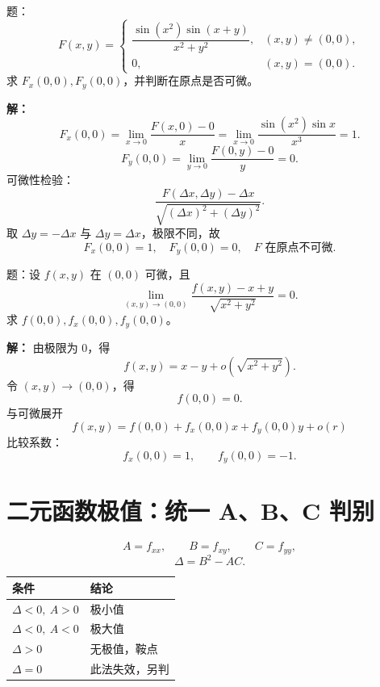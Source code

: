 \documentclass[11pt,a4paper,UTF8]{ctexart}
\begin{document}
\newpage

\begin{answerbox}[2020--2021 大题：分段函数偏导与可微性]
题：
\[
F(x,y)=
\begin{cases}
\dfrac{\sin(x^2)\sin(x+y)}{x^2+y^2},&(x,y)\ne(0,0),\\
0,&(x,y)=(0,0).
\end{cases}
\]
求 \(F_x(0,0),F_y(0,0)\)，并判断在原点是否可微。

\textbf{解：}
\[
F_x(0,0)=\lim_{x\to0}\frac{F(x,0)-0}{x}
=\lim_{x\to0}\frac{\sin(x^2)\sin x}{x^3}=1.
\]
\[
F_y(0,0)=\lim_{y\to0}\frac{F(0,y)-0}{y}=0.
\]
可微性检验：
\[
\frac{F(\Delta x,\Delta y)-\Delta x}{\sqrt{(\Delta x)^2+(\Delta y)^2}}.
\]
取 \(\Delta y=-\Delta x\) 与 \(\Delta y=\Delta x\)，极限不同，故
\[
\boxed{F_x(0,0)=1,\quad F_y(0,0)=0,\quad F\text{ 在原点不可微}.}
\]
\end{answerbox}

\begin{answerbox}[2021--2022 计算 4：由可微定义反推偏导]
题：设 \(f(x,y)\) 在 \((0,0)\) 可微，且
\[
\lim_{(x,y)\to(0,0)}
\frac{f(x,y)-x+y}{\sqrt{x^2+y^2}}=0.
\]
求 \(f(0,0),f_x(0,0),f_y(0,0)\)。

\textbf{解：}
由极限为 \(0\)，得
\[
f(x,y)=x-y+o\left(\sqrt{x^2+y^2}\right).
\]
令 \((x,y)\to(0,0)\)，得
\[
\boxed{f(0,0)=0}.
\]
与可微展开
\[
f(x,y)=f(0,0)+f_x(0,0)x+f_y(0,0)y+o(r)
\]
比较系数：
\[
\boxed{f_x(0,0)=1,\qquad f_y(0,0)=-1}.
\]
\end{answerbox}
\section{二元函数极值：统一 A、B、C 判别}

\begin{templatebox}[考试统一判别表]
\[
A=f_{xx},\qquad B=f_{xy},\qquad C=f_{yy},
\]
\[
\boxed{\Delta=B^2-AC.}
\]

\begin{center}
\renewcommand{\arraystretch}{1.25}
\begin{tabular}{p{5cm}p{6cm}}
\toprule
\textbf{条件} & \textbf{结论}\\
\midrule
\(\Delta<0,\ A>0\) & 极小值\\
\(\Delta<0,\ A<0\) & 极大值\\
\(\Delta>0\) & 无极值，鞍点\\
\(\Delta=0\) & 此法失效，另判\\
\bottomrule
\end{tabular}
\end{center}
\end{templatebox}
\end{document}
